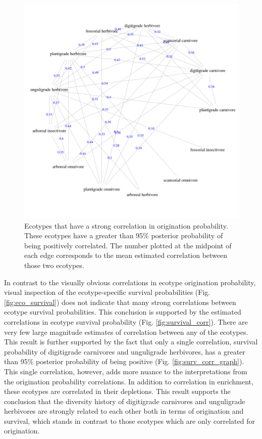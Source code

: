 \documentclass[12pt,letterpaper]{article}
\begin{document}
\begin{figure}[ht]
  \centering
  \includegraphics[width=\textwidth,height=\textheight,keepaspectratio=true]{figure/origin_sig_corr}
  \caption[Ecotypes with strong correlations in origination probability]{Ecotypes that have a strong correlation in origination probability. These ecotypes have a greater than 95\% posterior probability of being positively correlated. The number plotted at the midpoint of each edge corresponds to the mean estimated correlation between those two ecotypes.}
  \label{fig:origin_corr_graph}
\end{figure}


In contrast to the visually obvious correlations in ecotype origination probability, visual inspection of the ecotype-specific survival probabilities (Fig. \ref{fig:eco_survival}) does not indicate that many strong correlations between ecotype survival probabilities. This conclusion is supported by the estimated correlations in ecotype survival probability (Fig. \ref{fig:survival_corr}). There are very few large magnitude estimates of correlation between any of the ecotypes. This result is further supported by the fact that only a single correlation, survival probability of digitigrade carnivores and unguligrade herbivores, has a greater than 95\% posterior probability of being positive (Fig. \ref{fig:surv_corr_graph}). This single correlation, however, adds more nuance to the interpretations from the origination probability correlations. In addition to correlation in enrichment, these ecotypes are correlated in their depletions. This result supports the conclusion that the diversity history of digitigrade carnivores and unguligrade herbivores are strongly related to each other both in terms of origination and survival, which stands in contrast to those ecotypes which are only correlated for origination.
\end{document}
